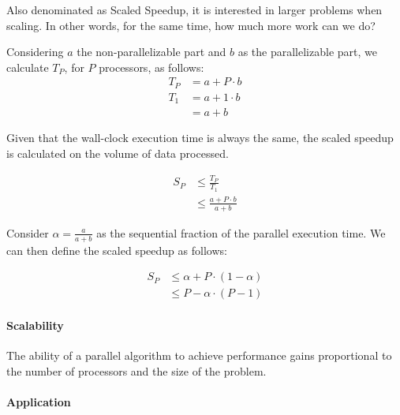 
Also denominated as Scaled Speedup, it is interested in larger problems when scaling.
In other words, for the same time, how much more work can we do?

Considering $a$ the non-parallelizable part and $b$ as the parallelizable part,
we calculate $T_P$, for $P$ processors, as follows:
\begin{equation}
    \begin{split}
        T_P & = a + P \cdot b\\
        T_1 & = a + 1 \cdot b\\
            & = a + b
    \end{split}
\end{equation}

Given that the wall-clock execution time is always the same,
the scaled speedup is calculated on the volume of data processed.

\begin{equation}
    \begin{split}
        S_P & \le \frac{T_P}{T_1}\\
        & \le \frac{a + P \cdot b}{a + b}
    \end{split}
\end{equation}

Consider $\alpha = \frac{a}{a+b}$ as the sequential fraction of the parallel execution time.
We can then define the scaled speedup as follows:

\begin{equation}
    \begin{split}
        S_P & \le \alpha + P \cdot (1-\alpha)\\
        & \le P - \alpha \cdot (P-1)
    \end{split}
\end{equation}

\paragraph{Scalability}
The ability of a parallel algorithm to achieve performance gains proportional to the number of processors and the size of the problem.

\paragraph{Application}

